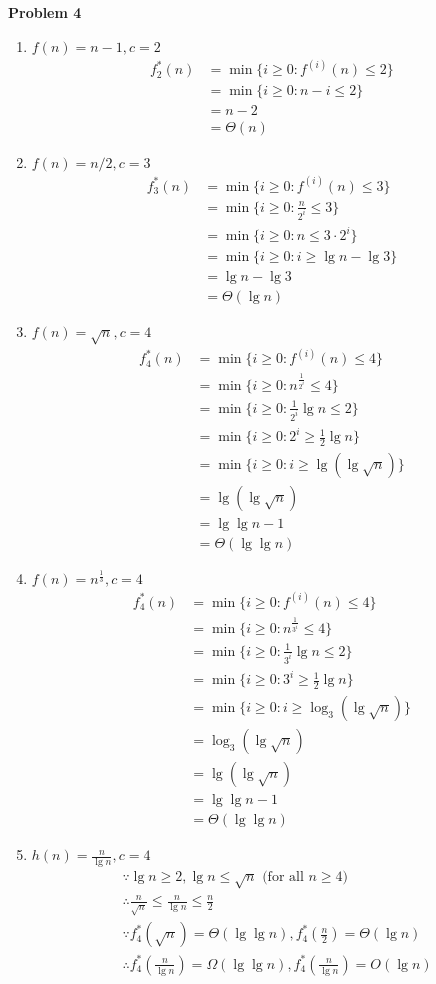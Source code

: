 \documentclass[12pt,letterpaper]{article}
\def\pp{\par\noindent}
\newcommand{\problem}[1]{ \bigskip \pp \textbf{Problem #1}\par}
\begin{document}
\problem{4}
\begin{enumerate}
\item $f(n)=n-1, c=2$\\
\begin{align*}
f_2^*(n)&=\min\{i\geq0: f^{(i)}(n)\leq2\}\\
&=\min\{i\geq0:n-i\leq2\}\\
&=n-2\\
&=\Theta(n)
\end{align*}
\item $f(n)=n/2, c=3$
\begin{align*}
f_3^*(n)&=\min\{i\geq0: f^{(i)}(n)\leq3\}\\
&=\min\{i\geq0:\frac{n}{2^i}\leq3\}\\
&=\min\{i\geq0:n\leq3\cdot 2^i\}\\
&=\min\{i\geq0:i\geq\lg n-\lg 3\}\\
&=\lg n-\lg 3\\
&=\Theta(\lg n)
\end{align*}
\item $f(n)=\sqrt{n}, c=4$
\begin{align*}
f_4^*(n)&=\min\{i\geq0: f^{(i)}(n)\leq4\}\\
&=\min\{i\geq0:n^{\frac{1}{2^i}}\leq4\}\\
&=\min\{i\geq0:\frac{1}{2^i}\lg n\leq2\}\\
&=\min\{i\geq0:2^i\geq\frac{1}{2}\lg n\}\\
&=\min\{i\geq0:i\geq\lg(\lg \sqrt{n})\}\\
&=\lg(\lg \sqrt{n})\\
&=\lg\lg n-1\\
&=\Theta(\lg\lg n)
\end{align*}
\item $f(n)=n^\frac{1}{3}, c=4$
\begin{align*}
f_4^*(n)&=\min\{i\geq0: f^{(i)}(n)\leq4\}\\
&=\min\{i\geq0:n^{\frac{1}{3^i}}\leq4\}\\
&=\min\{i\geq0:\frac{1}{3^i}\lg n\leq2\}\\
&=\min\{i\geq0:3^i\geq\frac{1}{2}\lg n\}\\
&=\min\{i\geq0:i\geq\log_3(\lg \sqrt{n})\}\\
&=\log_3(\lg \sqrt{n})\\
&=\lg(\lg \sqrt{n})\\
&=\lg\lg n-1\\
&=\Theta(\lg\lg n)
\end{align*}
\item $h(n)=\frac{n}{\lg n}, c=4$
\begin{align*}
&\because \lg n\geq2, \lg n\leq\sqrt{n}\text{ (for all $n\geq4$)}\\
&\therefore \frac{n}{\sqrt{n}}\leq\frac{n}{\lg n}\leq\frac{n}{2}\\
&\because f_4^*(\sqrt{n})=\Theta(\lg\lg n), f_4^*(\frac{n}{2})=\Theta(\lg n)\\
&\therefore f_4^*(\frac{n}{\lg n})=\Omega(\lg\lg n), f_4^*(\frac{n}{\lg n})=O(\lg n)
\end{align*}
\end{enumerate}
\end{document}
